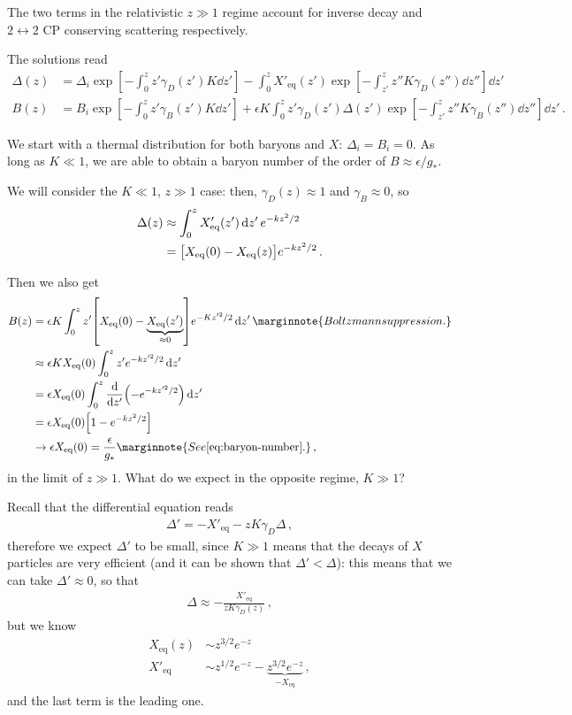 \documentclass[main.tex]{subfiles}
\begin{document}
The two terms in the relativistic \(z \gg 1\) regime account for inverse decay and \(2 \leftrightarrow 2\) CP conserving scattering respectively.

The solutions read 
%
\begin{align}
\Delta (z) &= \Delta _i \exp[ - \int_0^{z} z' \gamma _D (z') K \dd{z'}]
- \int_0^{z} X'_{\text{eq}} (z') \exp[- \int_{z'}^{z} z'' K \gamma _D(z'') \dd{z''}] \dd{z'}  \\
B(z) &= B_i \exp[- \int_0^{z} z' \gamma _B (z') K \dd{z'}]
+ \epsilon K \int_0^{z} z' \gamma _D (z') \Delta (z') \exp[- \int_{z'}^{z} z'' K \gamma _B (z'') \dd{z''}] \dd{z'}
\,.
\end{align}

We start with a thermal distribution for both baryons and \(X\): \(\Delta _i = B_i = 0\). 
As long as \(K \ll 1\), we are able to obtain a baryon number of the order of \(B \approx \epsilon / g_*\). 

We will consider the \(K \ll 1\), \(z \gg 1\) case: then, \(\gamma _D (z) \approx 1\) and \(\gamma _B \approx 0 \), so 
%
\begin{align}
\Delta (z) &\approx \int_0^{z} X'_{\text{eq}} (z') \dd{z'} e^{- k z^2 / 2}  \\
&= \qty[X _{\text{eq}} (0) - X _{\text{eq}} (z)] e^{- k z^2 / 2}
\,.
\end{align}

Then we also get
%
\begin{align}
B(z) &= \epsilon K \int_0^{z} z' \qty[X _{\text{eq}} (0) - \underbrace{X _{\text{eq}} (z')}_{\approx 0}] e^{- K z^{\prime 2} / 2} \dd{z'}  
\marginnote{Boltzmann suppression.}\\
&\approx \epsilon K X _{\text{eq}} (0) \int_0^{z} z' e^{- k z^{\prime 2} / 2} \dd{z'}  \\
&= \epsilon X _{\text{eq}}(0) \int_0^{z} \dv{}{z'} \qty(- e^{- k z^{\prime 2} / 2}) \dd{z'}  \\
&= \epsilon X _{\text{eq}} (0) \qty[1 - e^{-k z^2 /2}]  \\
&\to \epsilon X _{\text{eq}} (0) = \frac{\epsilon}{g_*}
\marginnote{See \eqref{eq:baryon-number}.}
\,,
\end{align}
%
in the limit of \(z \gg 1\). 
What do we expect in the opposite regime, \(K \gg 1\)? 

Recall that the differential equation reads 
%
\begin{align}
\Delta ' = - X' _{\text{eq}} - z K \gamma _D \Delta 
\,,
\end{align}
%
therefore we expect \(\Delta '\) to be small, since \(K \gg 1\) means that the decays of \(X\) particles are very efficient (and it can be shown that \(\Delta ' < \Delta \)): this means that we can take \(\Delta ' \approx 0\), so that 
%
\begin{align}
\Delta \approx - \frac{X' _{\text{eq}}}{z K \gamma _D(z)}
\,,
\end{align}
%
but we know 
%
\begin{align}
X _{\text{eq}} (z ) &\sim z^{3/2} e^{-z}  \\
X' _{\text{eq}} &\sim z^{1/2} e^{-z} - \underbrace{z^{3/2} e^{-z}}_{- X _{\text{eq}}}
\,,
\end{align}
%
and the last term is the leading one.
\end{document}
